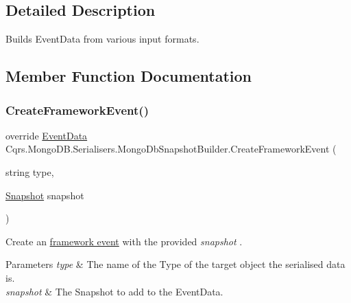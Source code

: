 \subsection{Detailed Description}
Builds Event\+Data from various input formats. 



\subsection{Member Function Documentation}
\mbox{\label{classCqrs_1_1MongoDB_1_1Serialisers_1_1MongoDbSnapshotBuilder_ae05840d11ff5c3aa710b89bfbff1688b_ae05840d11ff5c3aa710b89bfbff1688b}} 
\subsubsection{\texorpdfstring{Create\+Framework\+Event()}{CreateFrameworkEvent()}}
{\footnotesize\ttfamily override \hyperlink{classCqrs_1_1Events_1_1EventData}{Event\+Data} Cqrs.\+Mongo\+D\+B.\+Serialisers.\+Mongo\+Db\+Snapshot\+Builder.\+Create\+Framework\+Event (\begin{DoxyParamCaption}\item[{string}]{type,  }\item[{\hyperlink{classCqrs_1_1Snapshots_1_1Snapshot}{Snapshot}}]{snapshot }\end{DoxyParamCaption})\hspace{0.3cm}{\ttfamily [virtual]}}



Create an \hyperlink{}{framework event} with the provided {\itshape snapshot} . 


\begin{DoxyParams}{Parameters}
{\em type} & The name of the Type of the target object the serialised data is.\\
\hline
{\em snapshot} & The Snapshot to add to the Event\+Data.\\
\hline
\end{DoxyParams}


